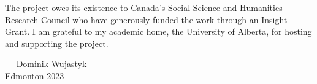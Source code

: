 The project owes its existence to Canada's Social Science and Humanities Research 
Council who have generously funded the work through an Insight Grant. I am grateful 
to my academic home, the University of Alberta, for hosting and supporting the 
project. 

{\flushright --- Dominik Wujastyk\\ Edmonton 2023\par}

\endinput


%

% 
%
%

